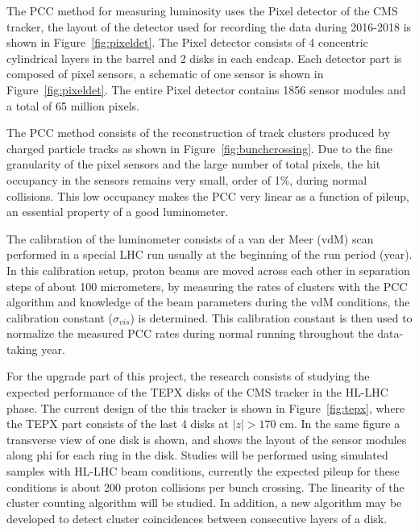 \documentclass[final,12p]{article}
\begin{document}
The PCC method for measuring luminosity uses the Pixel detector of the CMS tracker, the layout of the  detector used for recording the data during 2016-2018 is shown in Figure~\ref{fig:pixeldet}.
The Pixel detector consists of 4 concentric cylindrical layers in the barrel and 2 disks in each endcap.
Each detector part is composed of pixel sensors, a schematic of one sensor is shown in Figure~\ref{fig:pixeldet}.
The entire Pixel detector contains 1856 sensor modules and a total of 65 million pixels.

The PCC method consists of the reconstruction of track clusters produced by charged particle tracks as shown in Figure~\ref{fig:bunchcrossing}.
Due to the fine granularity of the pixel sensors and the large number of total pixels, the hit occupancy in the sensors remains very small, order of 1\%, during normal collisions.
This low occupancy makes the PCC  very linear as a function of pileup, an essential property of a good luminometer.

The calibration of the luminometer consists of a van der Meer (vdM) scan performed in a special LHC run usually at the beginning of the run period (year).
In this calibration setup, proton beams are moved across each other in separation steps of about 100 micrometers, by measuring the rates of clusters with the PCC algorithm and knowledge of the beam parameters during the vdM conditions, the calibration constant ($\sigma_{vis}$) is determined.
This calibration constant is then used to normalize the measured PCC rates during normal running throughout the data-taking year.

For the upgrade part of this project, the research consists of studying the expected performance of the TEPX disks of the CMS tracker in the HL-LHC phase.
The current design of the this tracker is shown in Figure~\ref{fig:tepx}, where the TEPX part consists of the last 4 disks at $|z|>170$ cm. In the same figure a transverse view of one disk is shown, and shows the layout of the sensor modules along phi for each ring in the disk.
Studies will be performed using simulated samples with HL-LHC beam conditions, currently the expected pileup for these conditions is about 200 proton collisions per bunch crossing.
The linearity of the cluster counting algorithm will be studied.
In addition, a new algorithm may be developed to detect cluster coincidences between consecutive layers of a disk.
\end{document}
